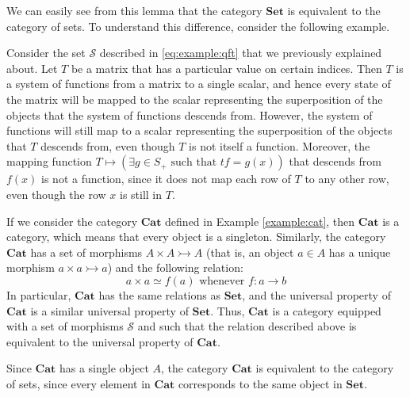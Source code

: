 \documentclass[a4paper,reqno,oneside]{article}
\begin{document}
We can easily see from this lemma that the category $\mathbf{Set}$ is equivalent to the category of sets. To understand this difference, consider the following example.
\begin{example}
    Consider the set $\mathcal{S}$ described in \eqref{eq:example:qft} that we previously explained about. Let $T$ be a matrix that has a particular value on certain indices. Then $T$ is a system of functions from a matrix to a single scalar, and hence every state of the matrix will be mapped to the scalar representing the superposition of the objects that the system of functions descends from. However, the system of functions will still map to a scalar representing the superposition of the objects that $T$ descends from, even though $T$ is not itself a function. Moreover, the mapping function $T \mapsto (\exists g \in S_{+} \text{ such that } tf = g(x))$ that descends from $f(x)$ is not a function, since it does not map each row of $T$ to any other row, even though the row $x$ is still in $T$.
\end{example}

\begin{remark}
    If we consider the category $\mathbf{Cat}$ defined in Example \ref{example:cat}, then $\mathbf{Cat}$ is a category, which means that every object is a singleton. Similarly, the category $\mathbf{Cat}$ has a set of morphisms $A \times A \rightarrowtail A$ (that is, an object $a \in A$ has a unique morphism $a \times a \rightarrowtail a$) and the following relation:
    \begin{equation}\label{eq:relation cat}
        a \times a \simeq f(a) \text{ whenever } f : a \to b
    \end{equation}
    In particular, $\mathbf{Cat}$ has the same relations as $\mathbf{Set}$, and the universal property of $\mathbf{Cat}$ is a similar universal property of $\mathbf{Set}$. Thus, $\mathbf{Cat}$ is a category equipped with a set of morphisms $\mathcal{S}$ and such that the relation described above is equivalent to the universal property of $\mathbf{Cat}$. 
\end{remark}

Since $\mathbf{Cat}$ has a single object $A$, the category $\mathbf{Cat}$ is equivalent to the category of sets, since every element in $\mathbf{Cat}$ corresponds to the same object in $\mathbf{Set}$.
\end{document}
